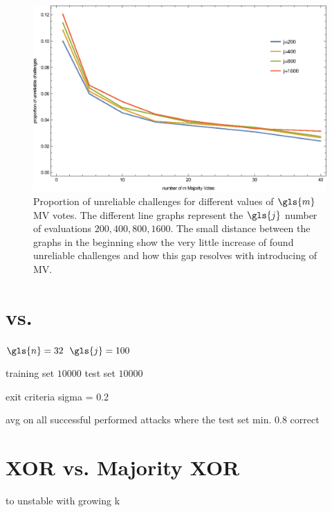 \begin{figure}[ht]
\includegraphics[width=1.00\textwidth]{images/mv-measurements-unstableChallenges.eps}
\caption{Proportion of unreliable challenges for different values of $\gls{m}$ \ac{MV} votes. The different line graphs represent the $\gls{j}$ number of evaluations $200, 400, 800, 1600$. The small distance between the graphs in the beginning show the very little increase of found unreliable challenges and how this gap resolves with introducing of \ac{MV}.}
\label{fig:cmamajorityvotemeasurementrelation}
\end{figure}


\section{\apufs vs. \mpufs}

$\gls{n} = 32$
$\gls{j} = 100$

training set $10000$
test set $10000$

exit criteria sigma = 0.2

avg on all successful performed attacks where the test set min. 0.8 correct



\section{\acs{XOR} \apufs vs. Majority \acs{XOR} \apufs}



\xpuf to unstable with growing k





